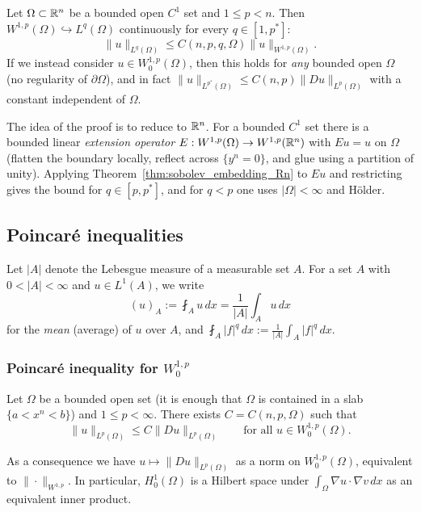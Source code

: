 \begin{theorem}\label{thm:sobolev_embedding_bounded}
Let $\Omega\subset\mathbb{R}^n$ be a bounded open $C^1$ set and $1\leq p<n$. Then $W^{1,p}(\Omega)\hookrightarrow L^q(\Omega)$ continuously for every $q\in[1,p^*]$:
$$\|u\|_{L^q(\Omega)}\leq C(n,p,q,\Omega)\|u\|_{W^{1,p}(\Omega)}.$$
If we instead consider $u\in W^{1,p}_0(\Omega)$, then this holds for \emph{any} bounded open $\Omega$ (no regularity of $\partial\Omega$), and in fact $\|u\|_{L^{p^*}(\Omega)}\leq C(n,p)\|Du\|_{L^p(\Omega)}$ with a constant independent of $\Omega$.
\end{theorem}
\begin{remark}
The idea of the proof is to reduce to $\mathbb{R}^n$. For a bounded $C^1$ set there is a bounded linear \emph{extension operator} $E:W^{1,p}(\Omega)\to W^{1,p}(\mathbb{R}^n)$ with $Eu=u$ on $\Omega$ (flatten the boundary locally, reflect across $\{y^n=0\}$, and glue using a partition of unity). Applying Theorem~\ref{thm:sobolev_embedding_Rn} to $Eu$ and restricting gives the bound for $q\in[p,p^*]$, and for $q<p$ one uses $|\Omega|<\infty$ and H\"older. \end{remark}

\subsection{Poincar\'e inequalities}
Let $|A|$ denote the Lebesgue measure of a measurable set $A$. For a set $A$ with $0<|A|<\infty$ and $u\in L^1(A)$, we write
$$(u)_A:=\fint_Au\,dx=\frac1{|A|}\int_Au\,dx$$
for the \emph{mean} (average) of $u$ over $A$, and $\fint_A|f|^q\,dx:=\frac{1}{|A|}\int_A|f|^q\,dx$.

\subsubsection{Poincar\'e inequality for $W^{1,p}_0$}
\begin{theorem}\label{thm:poincare_W0}
Let $\Omega$ be a bounded open set (it is enough that $\Omega$ is contained in a slab $\{a<x^n<b\}$) and $1\leq p<\infty$. There exists $C=C(n,p,\Omega)$ such that
$$\|u\|_{L^p(\Omega)}\leq C\|Du\|_{L^p(\Omega)}\qquad\text{for all }u\in W^{1,p}_0(\Omega).$$
\end{theorem}
\begin{remark}
As a consequence we have $u\mapsto\|Du\|_{L^p(\Omega)}$ as a norm on $W_0^{1,p}(\Omega)$, equivalent to $\|\cdot\|_{W^{1,p}}$. In particular, $H^1_0(\Omega)$ is a Hilbert space under $\int_\Omega\nabla u\cdot\nabla v\,dx$ as an equivalent inner product.

\end{remark}


